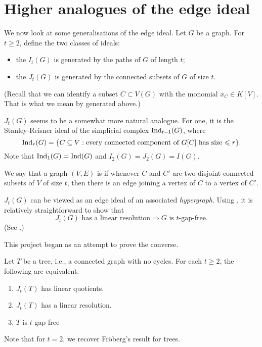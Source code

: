 \documentclass[12pt]{article}
\begin{document}
\section{Higher analogues of the edge ideal}

We now look at some generalisations of the edge ideal. Let $G$ be a graph. For $t \ge 2$, define the two classes of ideals:
\begin{itemize}
	\item the  $I_{t}(G)$ is generated by the paths of $G$ of length $t$;
	\item the  $J_{t}(G)$ is generated by the connected subsets of $G$ of size $t$.
\end{itemize}
(Recall that we can identify a subset $C \subset V(G)$ with the monomial $x_{C} \in K[V]$. That is what we mean by generated above.)

$J_{t}(G)$ seems to be a somewhat more natural analogue. For one, it is the Stanley-Reisner ideal of the simplicial complex $\operatorname{Ind}_{t - 1}(G)$, where
\begin{equation*} 
	\operatorname{Ind}_{r}(G) = \{C \subseteq V : \text{every connected component of $G[C]$ has size $\leqslant r$}\}.
\end{equation*}
Note that $\operatorname{Ind}_{1}(G) = \operatorname{Ind}(G)$ and $I_{2}(G) = J_{2}(G) = I(G)$.

\begin{defn}
	We say that a graph $(V, E)$ is  if whenever $C$ and $C'$ are two disjoint connected subsets of $V$ of size $t$, then there is an edge joining a vertex of $C$ to a vertex of $C'$.
\end{defn}

\begin{rem}
	$J_{t}(G)$ can be viewed as an edge ideal of an associated \emph{hypergraph}. Using \cite[Theorem 1.4]{HaWoodroofe}, it is relatively straightforward to show that
	\begin{equation*} 
		J_{t}(G) \text{ has a linear resolution} \Rightarrow \text{$G$ is $t$-gap-free}.
	\end{equation*}
	(See \cite[Corollary 4.3]{AnanthnarayanJavadekarMaithani}.)

	This project began as an attempt to prove the converse.
\end{rem}

\begin{thm} \label{thm:theorem-for-trees}
	Let $T$ be a tree, i.e., a connected graph with no cycles. For each $t \ge 2$, the following are equivalent.
	\begin{enumerate}[label=(\alph*)]
		\item $J_{t}(T)$ has linear quotients.
        \item $J_{t}(T)$ has a linear resolution.
        \item $T$ is $t$-gap-free
	\end{enumerate}
\end{thm}
Note that for $t = 2$, we recover Fr\"{o}berg's result for trees.
\end{document}
